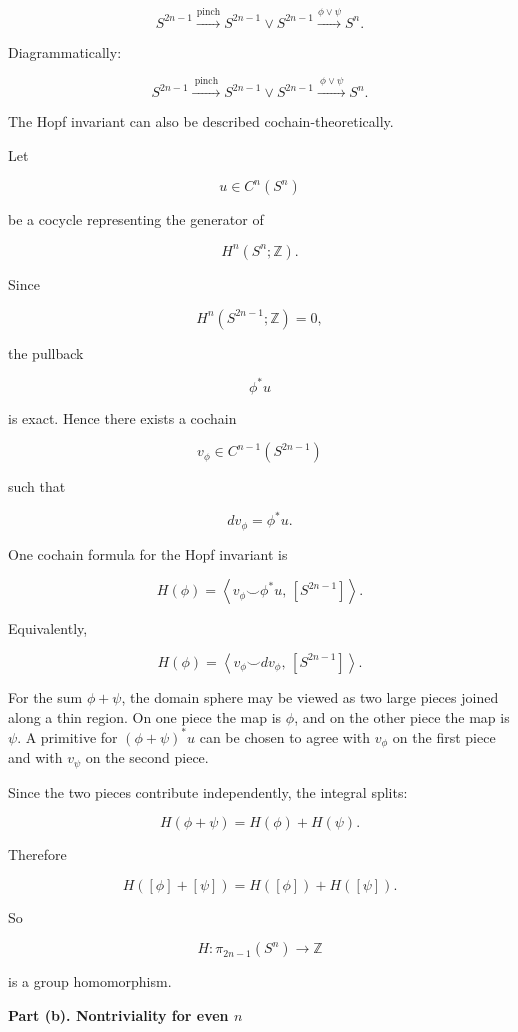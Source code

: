 \begin{solution}
\[
S^{2n-1}
\xrightarrow{\text{pinch}}
S^{2n-1}\vee S^{2n-1}
\xrightarrow{\phi\vee \psi}
S^n.
\]

Diagrammatically:



\[
S^{2n-1}
\xrightarrow{\ \mathrm{pinch}\ }
S^{2n-1}\vee S^{2n-1}
\xrightarrow{\ \phi\vee\psi\ }
S^n .
\]



The Hopf invariant can also be described cochain-theoretically.

Let

\[
u\in C^n(S^n)
\]

be a cocycle representing the generator of

\[
H^n(S^n;\mathbb Z).
\]

Since

\[
H^n(S^{2n-1};\mathbb Z)=0,
\]

the pullback

\[
\phi^*u
\]

is exact. Hence there exists a cochain

\[
v_\phi\in C^{n-1}(S^{2n-1})
\]

such that

\[
dv_\phi=\phi^*u.
\]

One cochain formula for the Hopf invariant is

\[
H(\phi)
=
\left\langle v_\phi\smile \phi^*u,\,[S^{2n-1}]\right\rangle.
\]

Equivalently,

\[
H(\phi)
=
\left\langle v_\phi\smile dv_\phi,\,[S^{2n-1}]\right\rangle.
\]

For the sum \(\phi+\psi\), the domain sphere may be viewed as two large pieces joined along a thin region. On one piece the map is \(\phi\), and on the other piece the map is \(\psi\). A primitive for \((\phi+\psi)^*u\) can be chosen to agree with \(v_\phi\) on the first piece and with \(v_\psi\) on the second piece.

Since the two pieces contribute independently, the integral splits:

\[
H(\phi+\psi)=H(\phi)+H(\psi).
\]

Therefore

\[
\boxed{
	H([\phi]+[\psi])=H([\phi])+H([\psi]).
}
\]

So

\[
\boxed{
	H:\pi_{2n-1}(S^n)\longrightarrow \mathbb Z
}
\]

is a group homomorphism.


\medskip
\noindent\textbf{Part (b). Nontriviality for even \(n\)}\par
\smallskip



\end{solution}
